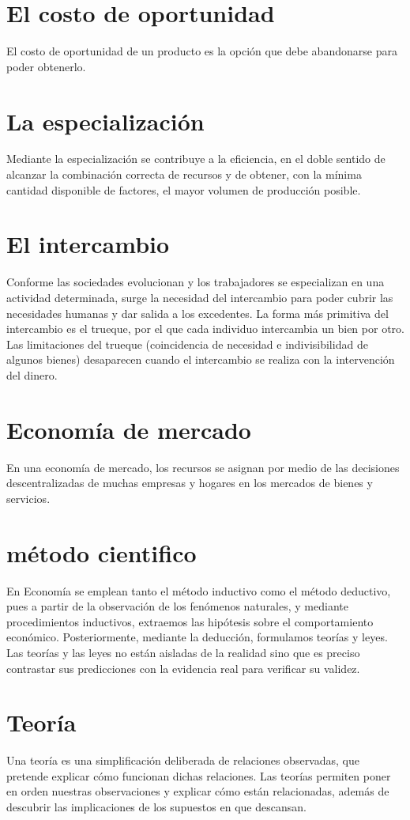 \documentclass[12pt]{book}
\begin{document}
\section{El costo de oportunidad}
El costo de oportunidad de un producto es la opción que debe abandonarse para poder obtenerlo.

\section{La especialización}
Mediante la especialización se contribuye a la eficiencia, en el doble sentido de alcanzar la combinación correcta de recursos y de obtener, con la mínima cantidad disponible de factores, el mayor volumen de producción posible.

\section{El intercambio}
Conforme las sociedades evolucionan y los trabajadores se especializan en una actividad determinada, surge la necesidad del intercambio para poder cubrir las necesidades humanas y dar salida a los excedentes. La forma más primitiva del intercambio es el
trueque, por el que cada individuo intercambia un bien por otro.
Las limitaciones del trueque (coincidencia de necesidad e indivisibilidad de algunos bienes) desaparecen cuando el intercambio se realiza con la intervención del dinero.

\section{Economía de mercado}En una economía de mercado, los recursos se asignan por medio de las decisiones descentralizadas
de muchas empresas y hogares en los mercados de bienes y servicios.

\section{método cientifico}
En Economía se emplean tanto el método inductivo como el método deductivo, pues a partir de la observación de los fenómenos naturales, y mediante procedimientos inductivos, extraemos las hipótesis sobre el comportamiento económico. Posteriormente,
mediante la deducción, formulamos teorías y leyes.
Las teorías y las leyes no están aisladas de la realidad sino que es preciso contrastar sus predicciones con la evidencia real para verificar su validez.

\section{Teoría}
Una teoría es una simplificación deliberada de relaciones observadas, que pretende explicar cómo funcionan dichas relaciones. Las teorías permiten poner en orden nuestras observaciones y explicar cómo están relacionadas, además de descubrir las implicaciones de los supuestos en que descansan.
\end{document}
